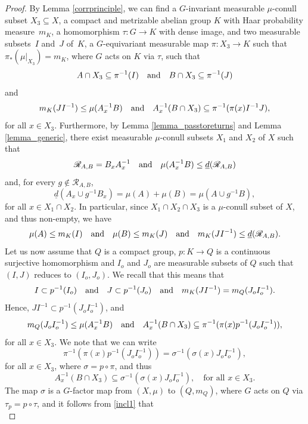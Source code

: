 \documentclass[JEP,XML,SOM,Unicode]{cedram}
\let\mathcal\mathscr
\newcommand{\cR}{\mathcal{R}}
\newcommand{\qand}{\quad\textup{and}\quad}
\theoremstyle{plain}
\theoremstyle{definition}
\begin{document}
\begin{proof}
By Lemma \ref{corrprinciple}, we can find a $G$-invariant measurable $\mu$-conull subset \hbox{$X_3 \subseteq X$}, a compact and
metrizable abelian group $K$ with Haar probability measure~$m_K$, a homomorphism $\tau : G \to K$ with dense image,
and two measurable subsets~$I$ and~$J$ of~$K$, a $G$-equivariant measurable map $\pi : X_3 \to K$ such that
$\pi_*(\mu |_{X_3}) = m_K$, where $G$ acts on $K$ via $\tau$, such that
\begin{equation}
\label{incl1}
A \cap X_3 \subseteq \pi^{-1}(I) \qand B \cap X_3 \subseteq \pi^{-1}(J)
\end{equation}
and
\[
m_K(JI^{-1}) \leq \mu(A_x^{-1}B)
\qand
A_x^{-1}(B \cap X_3) \subseteq \pi^{-1}(\pi(x) I^{-1}J),
\]
for all $x \in X_3$. Furthermore, by Lemma \ref{lemma_passtoreturns} and Lemma \ref{lemma_generic}, there exist measurable
$\mu$-conull subsets $X_1$ and $X_2$ of $X$
such that
\[
\cR_{A,B} = B_x A_x^{-1} \qand \mu(A_x^{-1}B) \leq \underline{d}(\cR_{A,B})
\]
and, for every $g \notin \cR_{A,B}$,
\begin{equation}
\label{recall_overshoot}
\underline{d}(A_x \cup g^{-1}B_x) = \mu(A) + \mu(B) = \mu(A \cup g^{-1}B),
\end{equation}
for all $x \in X_1 \cap X_2$. In particular, since $X_1 \cap X_2 \cap X_3$ is a $\mu$-conull subset of $X$, and thus non-empty, we have
\[
\mu(A) \leq m_K(I) \qand \mu(B) \leq m_K(J) \qand m_K(JI^{-1}) \leq \underline{d}(\cR_{A,B}).
\]
Let us now assume that $Q$ is a compact group, $p : K \to Q$ is a continuous surjective homomorphism and $I_o$ and $J_o$ are
measurable subsets of $Q$ such that $(I,J)$ reduces to $(I_o,J_o)$. We recall that this means that
\[
I \subset p^{-1}(I_o) \qand J \subset p^{-1}(J_o) \qand m_K(JI^{-1}) = m_Q(J_o I_o^{-1}).
\]
Hence, $J I^{-1} \subset p^{-1}(J_o I_o^{-1})$, and
\[
m_Q(J_oI_o^{-1}) \leq \mu(A_x^{-1}B)
\qand
A_x^{-1}(B \cap X_3) \subseteq \pi^{-1}(\pi(x) p^{-1}(J_o I_o^{-1})),
\]
for all $x \in X_3$.
We note that we can write
\[
\pi^{-1}(\pi(x) p^{-1}(J_o I_o^{-1})) = \sigma^{-1}(\sigma(x) J_o I_o^{-1}),
\]
for all $x \in X_3$, where $\sigma = p \circ \pi$, and thus
\begin{equation}
A_x^{-1}(B \cap X_3) \subseteq \sigma^{-1}(\sigma(x) J_o I_o^{-1}), \quad \textrm{for all $x \in X_3$}.
\end{equation}
The map $\sigma$ is a $G$-factor map from $(X,\mu)$ to $(Q,m_Q)$, where $G$ acts on
$Q$ via $\tau_p = p \circ \tau$, and it follows from \eqref{incl1} that
\begin{equation}

\end{equation}
\end{proof}
\end{document}
